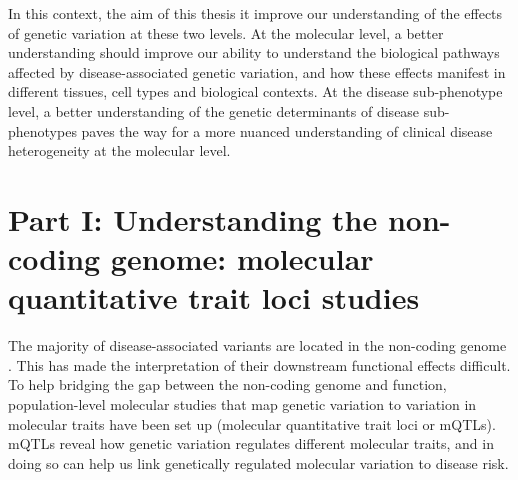 In this context, the aim of this thesis it improve our understanding of the effects of genetic variation at these two levels. At the molecular level, a better understanding should improve our ability to understand the biological pathways affected by disease-associated genetic variation, and how these effects manifest in different tissues, cell types and biological contexts. At the disease sub-phenotype level, a better understanding of the genetic determinants of disease sub-phenotypes paves the way for a more nuanced understanding of clinical disease heterogeneity at the molecular level. 



\section{Part I: Understanding the non-coding genome: molecular quantitative trait loci studies}
The majority of disease-associated variants are located in the non-coding genome \cite{Ahonen2009-eo,Degner2012-dq,Trynka2013-qs,Hindorff2009-te}. This has made the interpretation of their downstream functional effects difficult. To help bridging the gap between the non-coding genome and function, population-level molecular studies that map genetic variation to variation in molecular traits have been set up (molecular quantitative trait loci or mQTLs). mQTLs reveal how genetic variation regulates different molecular traits, and in doing so can help us link genetically regulated molecular variation to disease risk.\\ 

